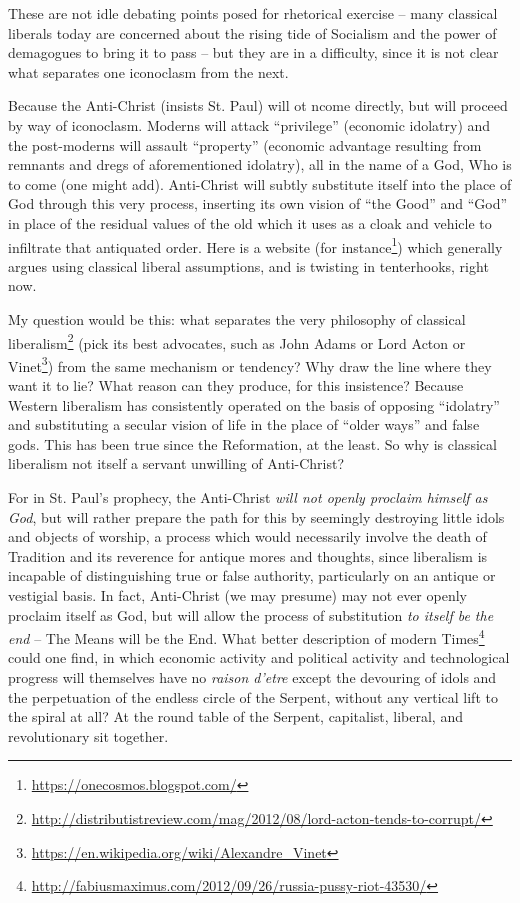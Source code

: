 These are not idle debating points posed for rhetorical exercise -- many classical liberals today are concerned about the rising tide of Socialism and the power of demagogues to bring it to pass -- but they are in a difficulty, since it is not clear what separates one iconoclasm from the next.

Because the Anti-Christ (insists St. Paul) will ot ncome directly, but will proceed by way of iconoclasm. Moderns will attack ``privilege'' (economic idolatry) and the post-moderns will assault ``property'' (economic advantage resulting from remnants and dregs of aforementioned idolatry), all in the name of a God, Who is to come (one might add). Anti-Christ will subtly substitute itself into the place of God through this very process, inserting its own vision of ``the Good'' and ``God'' in place of the residual values of the old which it uses as a cloak and vehicle to infiltrate that antiquated order. Here is a website (for instance\footnote{\url{https://onecosmos.blogspot.com/}}) which generally argues using classical liberal assumptions, and is twisting in tenterhooks, right now.

My question would be this: what separates the very philosophy of classical liberalism\footnote{\url{http://distributistreview.com/mag/2012/08/lord-acton-tends-to-corrupt/}} (pick its best advocates, such as John Adams or Lord Acton or Vinet\footnote{\url{https://en.wikipedia.org/wiki/Alexandre\_Vinet}}) from the same mechanism or tendency? Why draw the line where they want it to lie? What reason can they produce, for this insistence? Because Western liberalism has consistently operated on the basis of opposing ``idolatry'' and substituting a secular vision of life in the place of ``older ways'' and false gods. This has been true since the Reformation, at the least. So why is classical liberalism not itself a servant unwilling of Anti-Christ?

For in St. Paul's prophecy, the Anti-Christ \emph{will not openly proclaim himself as God}, but will rather prepare the path for this by seemingly destroying little idols and objects of worship, a process which would necessarily involve the death of Tradition and its reverence for antique mores and thoughts, since liberalism is incapable of distinguishing true or false authority, particularly on an antique or vestigial basis. In fact, Anti-Christ (we may presume) may not ever openly proclaim itself as God, but will allow the process of substitution \emph{to itself be the end} -- The Means will be the End. What better description of modern Times\footnote{\url{http://fabiusmaximus.com/2012/09/26/russia-pussy-riot-43530/}} could one find, in which economic activity and political activity and technological progress will themselves have no \emph{raison d'etre} except the devouring of idols and the perpetuation of the endless circle of the Serpent, without any vertical lift to the spiral at all? At the round table of the Serpent, capitalist, liberal, and revolutionary sit together.

